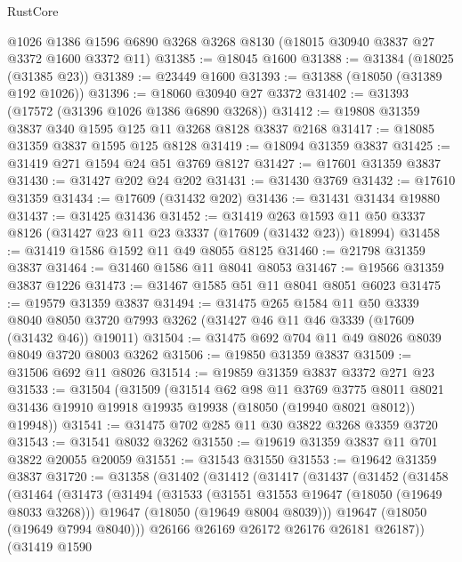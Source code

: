 \begin{lexlean}{RustCore}
\begin{coremodule}
    @1026
    @1386
    @1596
    @6890
    @3268
    @3268
    @8130
    (@18015 @30940 @3837 @27 @3372 @1600 @3372 @11)
@31385 := @18045 @1600
@31388 := @31384 (@18025 (@31385 @23))
@31389 := @23449 @1600
@31393 := @31388 (@18050 (@31389 @192 @1026))
@31396 := @18060 @30940 @27 @3372
@31402 := @31393 (@17572 (@31396 @1026 @1386 @6890 @3268))
@31412 := @19808 @31359 @3837 @340 @1595 @125 @11 @3268 @8128 @3837 @2168
@31417 := @18085 @31359 @3837 @1595 @125 @8128
@31419 := @18094 @31359 @3837
@31425 := @31419 @271 @1594 @24 @51 @3769 @8127
@31427 := @17601 @31359 @3837
@31430 := @31427 @202 @24 @202
@31431 := @31430 @3769
@31432 := @17610 @31359
@31434 := @17609 (@31432 @202)
@31436 := @31431 @31434 @19880
@31437 := @31425 @31436
@31452 := @31419
    @263
    @1593
    @11
    @50
    @3337
    @8126
    (@31427 @23 @11 @23 @3337 (@17609 (@31432 @23)) @18994)
@31458 := @31419 @1586 @1592 @11 @49 @8055 @8125
@31460 := @21798 @31359 @3837
@31464 := @31460 @1586 @11 @8041 @8053
@31467 := @19566 @31359 @3837 @1226
@31473 := @31467 @1585 @51 @11 @8041 @8051 @6023
@31475 := @19579 @31359 @3837
@31494 := @31475
    @265
    @1584
    @11
    @50
    @3339
    @8040
    @8050
    @3720
    @7993
    @3262
    (@31427 @46 @11 @46 @3339 (@17609 (@31432 @46)) @19011)
@31504 := @31475 @692 @704 @11 @49 @8026 @8039 @8049 @3720 @8003 @3262
@31506 := @19850 @31359 @3837
@31509 := @31506 @692 @11 @8026
@31514 := @19859 @31359 @3837 @3372 @271 @23
@31533 := @31504
    (@31509
      (@31514
        @62
        @98
        @11
        @3769
        @3775
        @8011
        @8021
        @31436
        @19910
        @19918
        @19935
        @19938
        (@18050 (@19940 @8021 @8012))
        @19948))
@31541 := @31475 @702 @285 @11 @30 @3822 @3268 @3359 @3720
@31543 := @31541 @8032 @3262
@31550 := @19619 @31359 @3837 @11 @701 @3822 @20055 @20059
@31551 := @31543 @31550
@31553 := @19642 @31359 @3837
@31720 := @31358
    (@31402
      (@31412
        (@31417
          (@31437
            (@31452
              (@31458
                (@31464
                  (@31473
                    (@31494
                      (@31533
                        (@31551 @31553 @19647 (@18050 (@19649 @8033 @3268)))
                        @19647
                        (@18050 (@19649 @8004 @8039)))
                      @19647
                      (@18050 (@19649 @7994 @8040)))
                    @26166
                    @26169
                    @26172
                    @26176
                    @26181
                    @26187))
                (@31419
                  @1590

\end{coremodule}
\end{lexlean}
